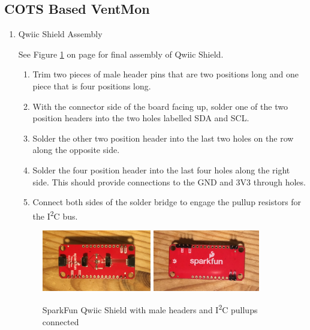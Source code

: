 \documentclass[11pt, letterpaper]{article}
\begin{document}
\subsection{COTS Based VentMon}
\begin{enumerate}

\item
Qwiic Shield Assembly

See Figure \ref{fig:qwiic} on page \pageref{fig:qwiic} for final assembly of Qwiic Shield.

\begin{enumerate}[label=1.\arabic*]
\item
Trim two pieces of male header pins that are two positions long and one piece that is four positions long.
\item
With the connector side of the board facing up, solder one of the two position headers into the two holes labelled SDA and SCL.
\item
Solder the other two position header into the last two holes on the row along the opposite side.
\item
Solder the four position header into the last four holes along the right side. This should provide connections to the GND and 3V3 through holes.
\item
Connect both sides of the solder bridge to engage the pullup resistors for the I\textsuperscript{2}C bus.
\end{enumerate}

\begin{figure}[H]
\centering
\includegraphics[width=0.45\textwidth]{images/qwiic_top.JPG}
\includegraphics[width=0.44\textwidth]{images/qwiic_bottom.JPG}
\caption{SparkFun Qwiic Shield with male headers and I\textsuperscript{2}C pullups connected} 
\label{fig:qwiic}
\end{figure}


\end{enumerate}
\end{document}
